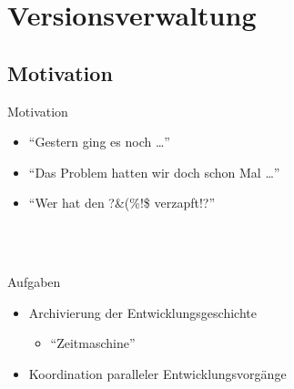 \section{Versionsverwaltung}
\subsection{Motivation}
\begin{frame}{Motivation}
	\begin{itemize}
		\item \enquote{Gestern ging es noch \dots}
		\item \enquote{Das Problem hatten wir doch schon Mal \dots}
		\item \enquote{Wer hat den ?\&(\%!\$ verzapft!?}
	\end{itemize}
	\ \\
	\pause
	\ \\
	\begin{block}{Aufgaben}
		\begin{itemize}
			\item Archivierung der Entwicklungsgeschichte
			\begin{itemize}
				\item \enquote{Zeitmaschine}
			\end{itemize}
			\item Koordination paralleler Entwicklungsvorgänge
		\end{itemize}
	\end{block}
\end{frame}

